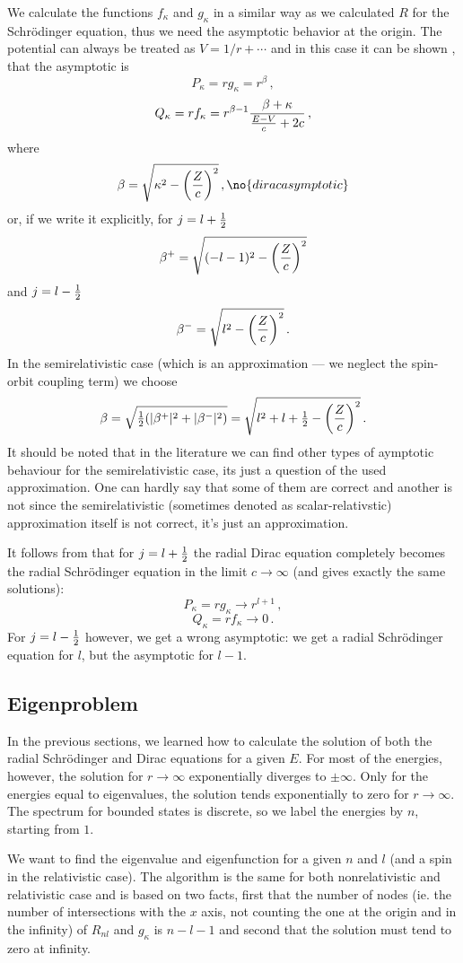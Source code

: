 We calculate the functions $f_\kappa$ and $g_\kappa$ in a similar
way as we calculated $R$ for the Schr\"odinger equation, thus we 
need the asymptotic behavior at the origin. The potential
can always be treated as $V=1/r+\cdots$ and in this case 
it can be shown \cite{zabloudil}, that the asymptotic is 
$$P_\kappa = r g_\kappa=r^{\beta}\,,$$
$$Q_\kappa = r f_\kappa=r^{\beta-1}{\beta+\kappa\over{E-V\over c}+2c}\,,$$
where 
$$\beta=\sqrt{\kappa^2-\left(Z\over c\right)^2}\,,\no{diracasymptotic}$$
or, if we write it explicitly, for $j=l+{\textstyle{1\over2}}$
$$\beta^+=\sqrt{(-l-1)^2-\left(Z\over c\right)^2}$$
and $j=l-{\textstyle{1\over2}}$
$$\beta^-=\sqrt{l^2-\left(Z\over c\right)^2}\,.$$
In the semirelativistic case (which is an approximation --- we neglect
the spin-orbit coupling term) we choose
$$\beta=\sqrt{{\textstyle{1\over2}}(|\beta^+|^2+|\beta^-|^2)}=
\sqrt{l^2+l+{\textstyle{1\over2}}-\left(Z\over c\right)^2}\,.$$
It should be noted that in the literature we can find other types of 
aymptotic behaviour for the semirelativistic case, its just a question of the
used approximation. One can hardly say that some of them are correct and
another is not since the semirelativistic (sometimes denoted as
scalar-relativstic) approximation itself is not correct, it's just an
approximation.

It follows from  that for $j=l+{\textstyle{1\over2}}$ the radial Dirac
equation completely becomes the radial Schr\"odinger equation in the limit
$c\to\infty$ (and gives exactly the same solutions):
$$P_\kappa = r g_\kappa \to r^{l+1}\,,$$
$$Q_\kappa = r f_\kappa \to 0\,.$$
For $j=l-{\textstyle{1\over2}}$ however, 
we get a wrong asymptotic: we get a radial Schr\"odinger equation for $l$, but
the asymptotic for $l-1$.


\subsection{Eigenproblem}

In the previous sections, we learned how to calculate the solution of both
the radial Schr\"odinger and Dirac equations for a given $E$.  For most of the
energies, however, the solution for $r\to\infty$ exponentially diverges to
$\pm\infty$. Only for the energies equal to eigenvalues, the solution tends
exponentially to zero for $r\to\infty$. The spectrum for bounded states is
discrete, so we label the energies by $n$, starting from $1$. 

We want to find the eigenvalue and eigenfunction for a given $n$ and $l$
(and a spin in the relativistic case).
The algorithm is the same for both nonrelativistic and relativistic case and
is based on two facts, first that the number of nodes (ie. the number of
intersections with the $x$ axis, not counting the one at the origin and in the
infinity) of $R_{nl}$ and $g_\kappa$ is $n-l-1$ and second that the solution
must tend to zero at infinity.

